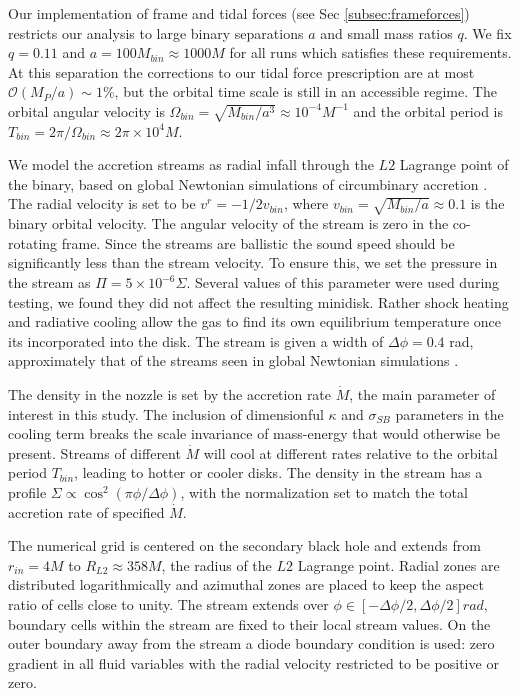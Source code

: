 \documentclass{emulateapj}
\newcommand{\De}{\Delta}
\newcommand{\sig}{\sigma}
\newcommand{\Sig}{\Sigma}
\newcommand{\ka}{\kappa}
\newcommand{\Om}{\Omega}
\newcommand{\OO}{\mathcal{O}}
\begin{document}
Our implementation of frame and tidal forces (see Sec \ref{subsec:frameforces}) restricts our analysis to large binary separations $a$ and small mass ratios $q$.  We fix $q=0.11$ and $a = 100 M_{bin} \approx 1000 M$ for all runs which satisfies these requirements.  At this separation the corrections to our tidal force prescription are at most $\OO({M_P / a}) \sim 1\%$, but the orbital time scale is still in an accessible regime.  The orbital angular velocity is $\Om_{bin} = \sqrt{M_{bin} / a^3} \approx 10^{-4} M^{-1}$ and the orbital period is $T_{bin} = 2\pi / \Om_{bin} \approx 2 \pi \times 10^4 M$.

We model the accretion streams as radial infall through the $L2$ Lagrange point of the binary, based on global Newtonian simulations of circumbinary accretion \citep{Farris14, Farris15A, Farris15B, DOrazio12, DOrazio16}.  The radial velocity is set to be $v^r = -1/2 v_{bin}$, where $v_{bin} = \sqrt{M_{bin}/a} \approx 0.1$ is the binary orbital velocity.  The angular velocity of the stream is zero in the co-rotating frame.  Since the streams are ballistic the sound speed should be significantly less than the stream velocity.  To ensure this, we set the pressure in the stream as $\Pi = 5 \times 10^{-6} \Sig$.  Several values of this parameter were used during testing, we found they did not affect the resulting minidisk. Rather shock heating and radiative cooling allow the gas to find its own equilibrium temperature once its incorporated into the disk.  The stream is given a width of $ \De \phi = 0.4$ rad, approximately that of the streams seen in global Newtonian simulations \cite{Farris14}.

The density in the nozzle is set by the accretion rate $\dot{M}$, the main parameter of interest in this study.  The inclusion of dimensionful $\ka$ and $\sig_{SB}$ parameters in the cooling term breaks the scale invariance of mass-energy that would otherwise be present.  Streams of different $\dot{M}$ will cool at different rates relative to the orbital period $T_{bin}$, leading to hotter or cooler disks.  The density in the stream has a profile $\Sig \propto \cos^2(\pi \phi / \De \phi)$, with the normalization set to match the total accretion rate of specified $\dot{M}$.


The numerical grid is centered on the secondary black hole and extends from $r_{in} = 4 M$ to $R_{L2} \approx 358 M$, the radius of the $L2$ Lagrange point. Radial zones are distributed logarithmically and azimuthal zones are placed to keep the aspect ratio of cells close to unity. The stream extends over $\phi \in [-\De \phi / 2, \De \phi / 2] rad$, boundary cells within the stream are fixed to their local stream values. On the outer boundary away from the stream a diode boundary condition is used: zero gradient in all fluid variables with the radial velocity restricted to be positive or zero.
\end{document}
